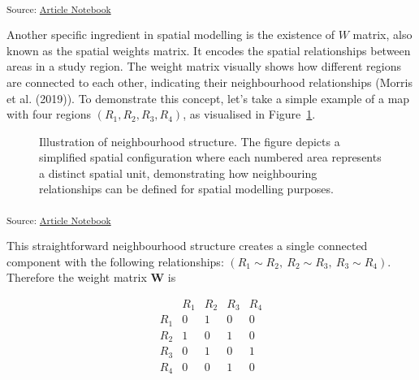 \documentclass[
  default,
]{sn-jnl}
\begin{document}
\textsubscript{Source:
\href{https://indiraputeri-phd.github.io/CAR_simcomp/manuscript.qmd.html}{Article
Notebook}}

Another specific ingredient in spatial modelling is the existence of
\(W\) matrix, also known as the spatial weights matrix. It encodes the
spatial relationships between areas in a study region. The weight matrix
visually shows how different regions are connected to each other,
indicating their neighbourhood relationships (Morris et al. (2019)). To
demonstrate this concept, let's take a simple example of a map with four
regions \((R_1, R_2, R_3, R_4)\), as visualised in
Figure~\ref{fig-neighsimple}.

\label{cell-fig-neighsimple}
\begin{figure}[H]


\caption{\label{fig-neighsimple}Illustration of neighbourhood structure.
The figure depicts a simplified spatial configuration where each
numbered area represents a distinct spatial unit, demonstrating how
neighbouring relationships can be defined for spatial modelling
purposes.}

\end{figure}%

\textsubscript{Source:
\href{https://indiraputeri-phd.github.io/CAR_simcomp/manuscript.qmd.html}{Article
Notebook}}

This straightforward neighbourhood structure creates a single connected
component with the following relationships:
\((R_1 \sim R_2,\ R_2 \sim R_3,\ R_3 \sim R_4)\). Therefore the weight
matrix \(\boldsymbol{W}\) is

\[
\begin{array}{ccccc}
    & R_1 & R_2 & R_3 & R_4 \\
R_1 & 0 & 1 & 0 & 0\\ 
R_2 & 1 & 0 & 1 & 0\\ 
R_3 & 0 & 1 & 0 & 1\\
R_4 & 0 & 0 & 1 & 0\\
\end{array}
\]
\end{document}
